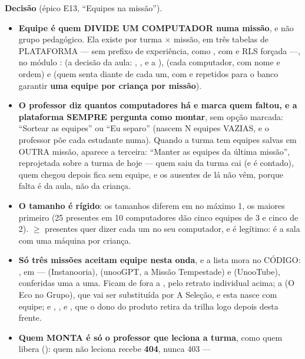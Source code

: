 \textbf{Decisão} (épico E13, \enquote{Equipes na missão}).

\begin{itemize}
  \item \textbf{Equipe é quem DIVIDE UM COMPUTADOR numa missão}, e não grupo
    pedagógico. Ela existe por turma $\times$ missão, em três tabelas de
    PLATAFORMA --- sem prefixo de experiência, como , com
     e RLS forçada ---, no módulo :
     (a decisão da aula: , ,
     e a ),  (cada computador, com nome e
    ordem) e  (quem senta diante de cada um, com
     e  repetidos para o banco garantir \textbf{uma
    equipe por criança por missão}).
  \item \textbf{O professor diz quantos computadores há e marca quem faltou, e a
    plataforma SEMPRE pergunta como montar}, sem opção marcada:
    \enquote{Sortear as equipes} ou \enquote{Eu separo} (nascem N equipes
    VAZIAS, e o professor põe cada estudante numa). Quando a turma tem equipes
    salvas em OUTRA missão, aparece a terceira: \enquote{Manter as equipes da
    última missão}, reprojetada sobre a turma de hoje --- quem saiu da turma cai
    (e é contado), quem chegou depois fica sem equipe, e os ausentes de lá não
    vêm, porque falta é da aula, não da criança.
  \item \textbf{O tamanho é rígido}: os tamanhos diferem em no máximo 1, os
    maiores primeiro (25 presentes em 10 computadores dão cinco equipes de 3 e
    cinco de 2).  $\geq$ presentes quer dizer cada um no seu
    computador, e é legítimo: é a sala com uma máquina por criança.
  \item \textbf{Só três missões aceitam equipe nesta onda}, e a lista mora no
    CÓDIGO: , em  ---
     (Instanooria),  (unooGPT, a Missão
    Tempestade) e  (UnooTube), conferidas uma a uma. Ficam de
    fora a , pelo retrato individual acima; a
     (O Eco no Grupo), que vai ser substituída por A Seleção, e
    esta nasce com equipe; e , ,  e
    , que o dono do produto retira da trilha logo depois desta
    frente.
  \item \textbf{Quem MONTA é só o professor que leciona a turma}, como quem
    libera (): quem não leciona recebe \textbf{404}, nunca 403 ---

\end{itemize}
